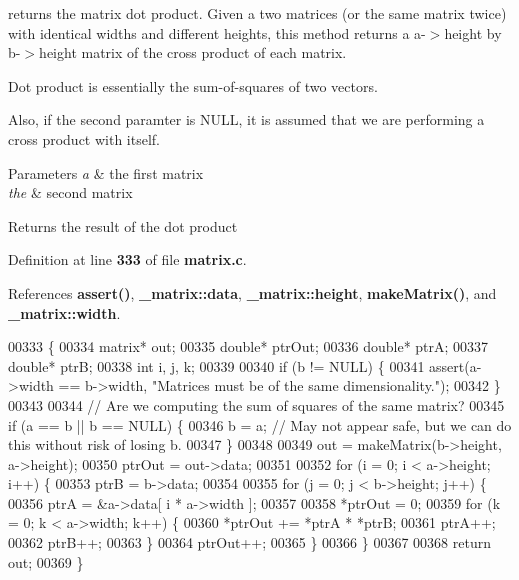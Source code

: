 returns the matrix dot product. Given a two matrices (or the same matrix twice) with identical widths and different heights, this method returns a a-\/$>$height by b-\/$>$height matrix of the cross product of each matrix. 

Dot product is essentially the sum-\/of-\/squares of two vectors.

Also, if the second paramter is N\+U\+LL, it is assumed that we are performing a cross product with itself. 
\begin{DoxyParams}{Parameters}
{\em a} & the first matrix \\
\hline
{\em the} & second matrix \\
\hline
\end{DoxyParams}
\begin{DoxyReturn}{Returns}
the result of the dot product 
\end{DoxyReturn}


Definition at line \textbf{ 333} of file \textbf{ matrix.\+c}.



References \textbf{ assert()}, \textbf{ \+\_\+matrix\+::data}, \textbf{ \+\_\+matrix\+::height}, \textbf{ make\+Matrix()}, and \textbf{ \+\_\+matrix\+::width}.


\begin{DoxyCode}
00333                                                \{
00334     matrix* out;
00335     \textcolor{keywordtype}{double}* ptrOut;
00336     \textcolor{keywordtype}{double}* ptrA;
00337     \textcolor{keywordtype}{double}* ptrB;
00338     \textcolor{keywordtype}{int} i, j, k;
00339 
00340     \textcolor{keywordflow}{if} (b != NULL) \{
00341         assert(a->width == b->width, \textcolor{stringliteral}{"Matrices must be of the same dimensionality."});
00342     \}
00343 
00344     \textcolor{comment}{// Are we computing the sum of squares of the same matrix?}
00345     \textcolor{keywordflow}{if} (a == b || b == NULL) \{
00346         b = a; \textcolor{comment}{// May not appear safe, but we can do this without risk of losing b.}
00347     \}
00348 
00349     out = makeMatrix(b->height, a->height);
00350     ptrOut = out->data;
00351 
00352     \textcolor{keywordflow}{for} (i = 0; i < a->height; i++) \{
00353         ptrB = b->data;
00354 
00355         \textcolor{keywordflow}{for} (j = 0; j < b->height; j++) \{
00356             ptrA = &a->data[ i * a->width ];
00357 
00358             *ptrOut = 0;
00359             \textcolor{keywordflow}{for} (k = 0; k < a->width; k++) \{
00360                 *ptrOut += *ptrA * *ptrB;
00361                 ptrA++;
00362                 ptrB++;
00363             \}
00364             ptrOut++;
00365         \}
00366     \}
00367 
00368     \textcolor{keywordflow}{return} out;
00369 \}
\end{DoxyCode}
\mbox{\label{matrix_8h_ae98365c910e9d688d2bdedec50d89a6b}} 
